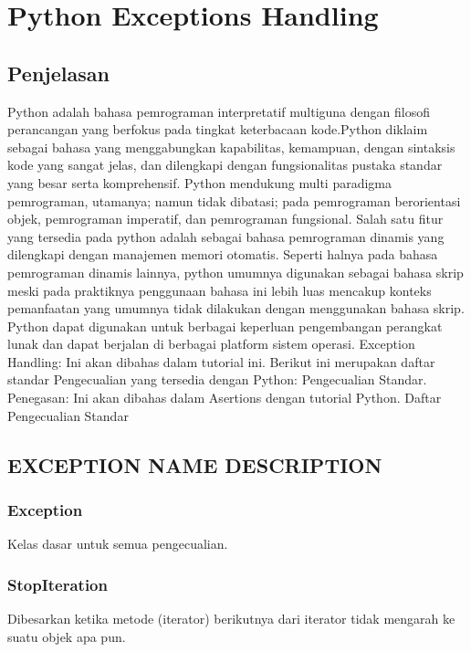 
                                          \section{Python Exceptions Handling}

\subsection{Penjelasan}
Python adalah bahasa pemrograman interpretatif multiguna dengan filosofi perancangan yang berfokus pada tingkat keterbacaan kode.Python diklaim sebagai bahasa yang menggabungkan kapabilitas, kemampuan, dengan sintaksis kode yang sangat jelas, dan dilengkapi dengan fungsionalitas pustaka standar yang besar serta komprehensif.
Python mendukung multi paradigma pemrograman, utamanya; namun tidak dibatasi; pada pemrograman berorientasi objek, pemrograman imperatif, dan pemrograman fungsional. Salah satu fitur yang tersedia pada python adalah sebagai bahasa pemrograman dinamis yang dilengkapi dengan manajemen memori otomatis. Seperti halnya pada bahasa pemrograman dinamis lainnya, python umumnya digunakan sebagai bahasa skrip meski pada praktiknya penggunaan bahasa ini lebih luas mencakup konteks pemanfaatan yang umumnya tidak dilakukan dengan menggunakan bahasa skrip. Python dapat digunakan untuk berbagai keperluan pengembangan perangkat lunak dan dapat berjalan di berbagai platform sistem operasi.
Exception Handling: Ini akan dibahas dalam tutorial ini. Berikut ini merupakan daftar standar Pengecualian yang tersedia dengan Python: Pengecualian Standar.
Penegasan: Ini akan dibahas dalam Asertions dengan tutorial Python. 
Daftar Pengecualian Standar 
\subsection{EXCEPTION NAME DESCRIPTION}

\subsubsection{Exception}
Kelas dasar untuk semua pengecualian.

\subsubsection{StopIteration}
Dibesarkan ketika metode (iterator) berikutnya dari iterator tidak mengarah ke suatu objek apa pun.

